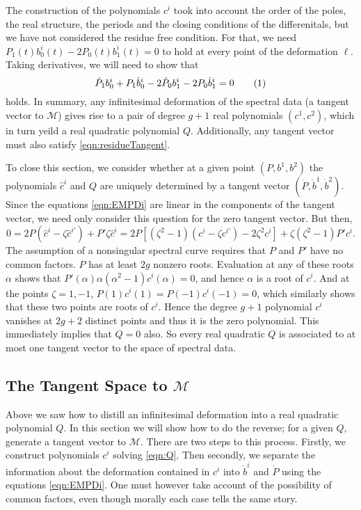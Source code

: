 The construction of the polynomials $c^i$ took into account the order of the poles, the real structure, the periods and the closing conditions of the differenitals, but we have not considered the residue free condition. For that, we need $P_1(t)b^i_0(t) - 2P_0(t)b^i_1(t) = 0$ to hold at every point of the deformation $\ell$. Taking derivatives, we will need to show that
\[
\dot{P}_1 b^i_0 + P_1 \dot{b}^i_0 - 2 \dot{P}_0 b^i_1 - 2 P_0 \dot{b}^i_1 = 0 \labelthis{eqn:residueTangent}
\]
holds. In summary, any infinitesimal deformation of the spectral data (a tangent vector to $\mathcal{M}$) gives rise to a pair of degree $g+1$ real polynomials $(c^1,c^2)$, which in turn yeild a real quadratic polynomial $Q$. Additionally, any tangent vector must also satisfy \eqref{eqn:residueTangent}.

To close this section, we consider whether at a given point $(P,b^1,b^2)$ the polynomials $\hat{c}^i$ and $Q$ are uniquely determined by a tangent vector $(\dot P, \dot b^1, \dot b^2)$. Since the equations \eqref{eqn:EMPDi} are linear in the components of the tangent vector, we need only consider this question for the zero tangent vector. But then,
\[
0 = 2P\left( \hat {c}^i - \zeta\hat {c}^{i\prime}\right) + P'\zeta\hat {c}^i = 2P\left[ (ζ^2-1) (c^i - ζc^{i\prime}) - 2ζ^2c^i \right] + ζ(ζ^2-1)P'c^i.
\]
The assumption of a nonsingular spectral curve requires that $P$ and $P'$ have no common factors. $P$ has at least $2g$ nonzero roots. Evaluation at any of these roots $α$ shows that $P'(α)α(α^2-1)c^i(α) = 0$, and hence $α$ is a root of $c^i$. And at the points $ζ = 1,-1$, $P(1)c^i(1) = P(-1)c^i(-1) = 0$, which similarly shows that these two points are roots of $c^i$. Hence the degree $g+1$ polynomial $c^i$ vanishes at $2g+2$ distinct points and thus it is the zero polynomial. This immediately implies that $Q=0$ also. So every real quadratic $Q$ is associated to at most one tangent vector to the space of spectral data.













\subsection{The Tangent Space to $\mathcal{M}$}
Above we saw how to distill an infinitesimal deformation into a real quadratic polynomial $Q$. In this section we will show how to do the reverse; for a given $Q$, generate a tangent vector to $\mathcal{M}$. There are two steps to this process. Firstly, we construct polynomials $c^i$ solving \eqref{eqn:Q}. Then secondly, we separate the information about the deformation contained in $c^i$ into $\dot{b}^i$ and $\dot{P}$ using the equations \eqref{eqn:EMPDi}. One must however take account of the possibility of common factors, even though morally each case tells the same story.

